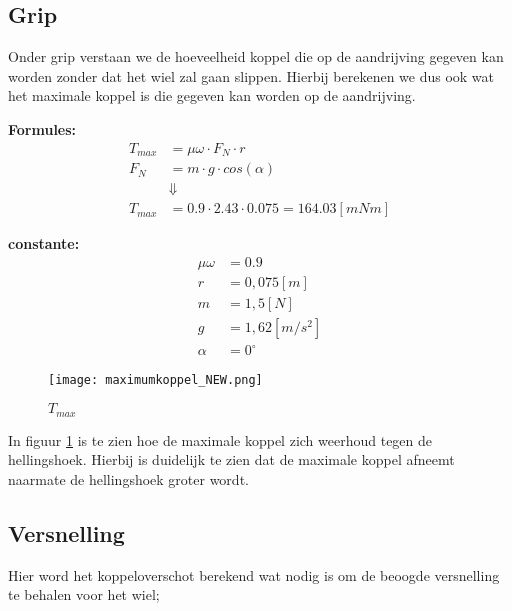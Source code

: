 \subsection{Grip}
    Onder grip verstaan we de hoeveelheid koppel die op de aandrijving gegeven kan worden zonder dat het wiel zal gaan slippen. Hierbij berekenen we dus ook wat het maximale koppel is die gegeven kan worden op de aandrijving.

    \begin{multicols}{2}
        \textbf{Formules:}
        \begin{equation}
            \begin{split}
                T_{max} &= \mu \omega \cdot F_{N} \cdot r \\
                F_{N} &= m \cdot g \cdot cos(\alpha) \\
                &\Downarrow \\
                T_{max} &= 0.9 \cdot 2.43 \cdot 0.075 = 164.03 [mNm]
            \end{split}
        \end{equation}

        \textbf{constante:}
        \begin{equation*}
            \begin{split}
                \mu \omega &= 0.9 \\
                r &= 0,075 [m] \\
                m &= 1,5 [N] \\
                g &= 1,62 [m/s^2] \\
                \alpha &= 0^\circ 
            \end{split}
        \end{equation*}
    \end{multicols}

    \begin{figure}[H]
        \centering
        \texttt{[image: maximumkoppel\_NEW.png]}
        \caption{$T_{max}$}
        \label{fig:peanut}
    \end{figure}

    In figuur \ref{fig:peanut} is te zien hoe de maximale koppel zich weerhoud tegen de hellingshoek. Hierbij is duidelijk te zien dat de maximale koppel afneemt naarmate de hellingshoek groter wordt.

\subsection{Versnelling}
    Hier word het koppeloverschot berekend wat nodig is om de beoogde versnelling te behalen voor het wiel; 

